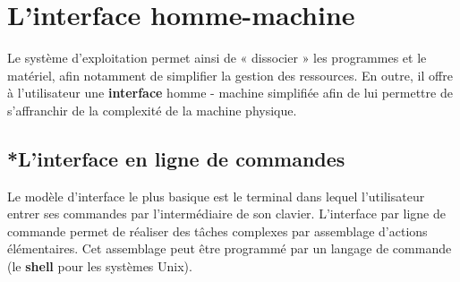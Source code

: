 \section{L'interface homme-machine}
Le système d’exploitation permet ainsi de « dissocier » les programmes et le matériel, afin notamment de simplifier la gestion des ressources. En outre, il offre  à l’utilisateur une \textbf{interface} homme - machine simplifiée afin de lui permettre de s’affranchir de la complexité de la machine physique. \\


\subsection{*L'interface en ligne de commandes}
Le modèle d'interface le plus basique est le terminal dans lequel l'utilisateur entrer ses commandes par l’intermédiaire de son clavier. L'interface par ligne de commande permet de réaliser des tâches complexes par assemblage d’actions élémentaires. Cet assemblage peut être programmé par un langage de commande (le \textbf{shell} pour les systèmes Unix).\\

